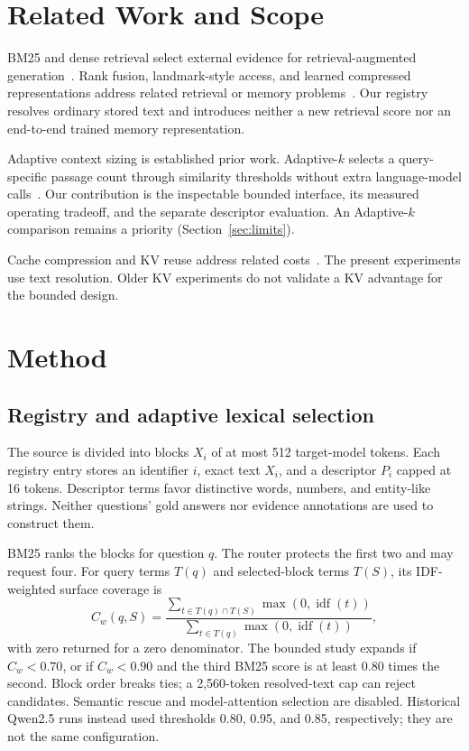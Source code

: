 \documentclass[runningheads]{llncs}
\begin{document}
\section{Related Work and Scope}
BM25 and dense retrieval select external evidence for retrieval-augmented generation~\cite{robertson2009bm25,lewis2020rag,reimers2019sbert}. Rank fusion, landmark-style access, and learned compressed representations address related retrieval or memory problems~\cite{cormack2009rrf,mohtashami2023landmark,mu2023gist,cheng2024xrag}. Our registry resolves ordinary stored text and introduces neither a new retrieval score nor an end-to-end trained memory representation.

Adaptive context sizing is established prior work. Adaptive-$k$ selects a query-specific passage count through similarity thresholds without extra language-model calls~\cite{taguchi2025adaptivek}. Our contribution is the inspectable bounded interface, its measured operating tradeoff, and the separate descriptor evaluation. An Adaptive-$k$ comparison remains a priority (Section~\ref{sec:limits}).

Cache compression and KV reuse address related costs~\cite{li2024snapkv,lu2024turborag}. The present experiments use text resolution. Older KV experiments do not validate a KV advantage for the bounded design.

\section{Method}
\subsection{Registry and adaptive lexical selection}
The source is divided into blocks $X_i$ of at most 512 target-model tokens. Each registry entry stores an identifier $i$, exact text $X_i$, and a descriptor $P_i$ capped at 16 tokens. Descriptor terms favor distinctive words, numbers, and entity-like strings. Neither questions' gold answers nor evidence annotations are used to construct them.

BM25 ranks the blocks for question $q$. The router protects the first two and may request four. For query terms $T(q)$ and selected-block terms $T(S)$, its IDF-weighted surface coverage is
\begin{equation}
C_w(q,S)=\frac{\sum_{t\in T(q)\cap T(S)}\max(0,\operatorname{idf}(t))}
{\sum_{t\in T(q)}\max(0,\operatorname{idf}(t))},
\end{equation}
with zero returned for a zero denominator. The bounded study expands if $C_w<0.70$, or if $C_w<0.90$ and the third BM25 score is at least 0.80 times the second. Block order breaks ties; a 2,560-token resolved-text cap can reject candidates. Semantic rescue and model-attention selection are disabled. Historical Qwen2.5 runs instead used thresholds 0.80, 0.95, and 0.85, respectively; they are not the same configuration.
\end{document}
